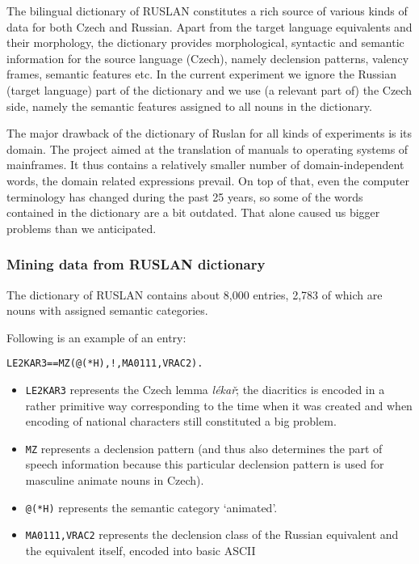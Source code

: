 \documentclass[letterpaper]{article}
\newcommand{\todofn}[1] {
 \footnote{\textbf{TODO : #1}}}
\begin{document}
The bilingual dictionary of RUSLAN constitutes a rich source of various kinds of data for both Czech and Russian. Apart from the target language equivalents and their morphology, the dictionary provides  morphological, syntactic and semantic information for the source language (Czech), namely declension patterns, valency frames, semantic features etc. In the current experiment we ignore the Russian (target language)
part of the dictionary and we use (a relevant part of) the Czech side, namely the semantic features assigned to all nouns in the dictionary. 

The major drawback of the dictionary of Ruslan for all kinds of experiments is its domain. The project aimed at the translation of manuals to operating systems of mainframes. It thus contains a relatively smaller number of domain-independent words, the domain related expressions prevail. On top of that, even the computer terminology has changed during the past 25 years, so  some of the words contained in the dictionary are a bit outdated. 
That alone caused us bigger problems than we anticipated.

\subsubsection{Mining data from RUSLAN dictionary}

The dictionary of RUSLAN contains about 8,000 entries, 2,783 of which are nouns with assigned semantic categories.

Following is an example of an entry:

\begin{verbatim}
LE2KAR3==MZ(@(*H),!,MA0111,VRAC2).
\end{verbatim}

\begin{itemize}
\item \texttt{LE2KAR3} represents the Czech lemma \emph{l\'{e}ka\v{r}}; the diacritics is encoded in a rather primitive way corresponding to the time when it was created and when encoding of national characters still constituted a big problem.
\item \texttt{MZ} represents a declension pattern (and thus also determines the part of speech information because this particular declension pattern is used for masculine animate nouns in Czech).
\item \texttt{@(*H)} represents the semantic category `animated'.
\item \texttt{MA0111,VRAC2} represents the declension class of the Russian equivalent and the equivalent itself, encoded into basic ASCII
\end{itemize}
\end{document}
